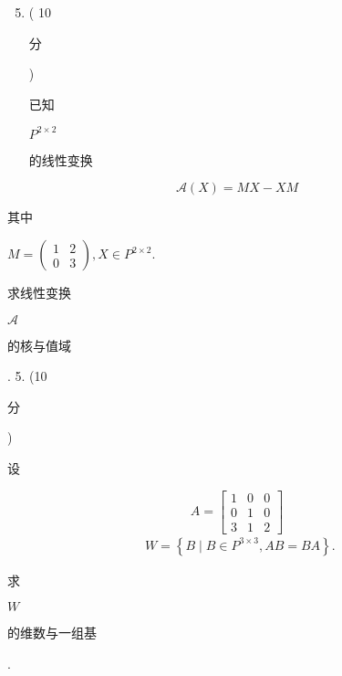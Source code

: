 \documentclass[10pt]{article}
\begin{document}
\begin{enumerate}
  \setcounter{enumi}{4}
  \item ( 10 \begin{CJK}{UTF8}{mj}分\end{CJK}) \begin{CJK}{UTF8}{mj}已知\end{CJK} $P^{2 \times 2}$ \begin{CJK}{UTF8}{mj}的线性变换\end{CJK}
\end{enumerate}
$$
\mathscr{A}(X)=M X-X M
$$
\begin{CJK}{UTF8}{mj}其中\end{CJK} $M=\left(\begin{array}{ll}1 & 2 \\ 0 & 3\end{array}\right), X \in P^{2 \times 2}$. \begin{CJK}{UTF8}{mj}求线性变换\end{CJK} $\mathscr{A}$ \begin{CJK}{UTF8}{mj}的核与值域\end{CJK}. 5. (10 \begin{CJK}{UTF8}{mj}分\end{CJK}) \begin{CJK}{UTF8}{mj}设\end{CJK}
$$
A=\left[\begin{array}{ccc}
1 & 0 & 0 \\
0 & 1 & 0 \\
3 & 1 & 2
\end{array}\right]
$$
$$
\begin{aligned}
& W=\left\{B \mid B \in P^{3 \times 3}, A B=B A\right\} \text {. }
\end{aligned}
$$
\begin{CJK}{UTF8}{mj}求\end{CJK} $W$ \begin{CJK}{UTF8}{mj}的维数与一组基\end{CJK}.
\end{document}
